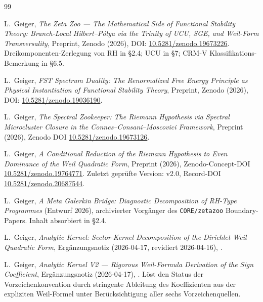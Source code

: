 \documentclass[a4paper,10pt,twocolumn]{article}
\theoremstyle{definition}
\theoremstyle{remark}
\begin{document}
\begin{thebibliography}{99}


L.~Geiger,
\textit{The Zeta Zoo --- The Mathematical Side of Functional
Stability Theory: Branch-Local Hilbert--P\'olya via the Trinity of
UCU, SGE, and Weil-Form Transversality},
Preprint, Zenodo (2026), DOI:
\href{https://doi.org/10.5281/zenodo.19673226}{10.5281/zenodo.19673226}.
Dreikomponenten-Zerlegung von $\mathrm{RH}$ in \S2.4; UCU in \S7;
CRM-V Klassifikations-Bemerkung in \S6.5.

L.~Geiger,
\textit{FST Spectrum Duality: The Renormalized Free Energy Principle
as Physical Instantiation of Functional Stability Theory},
Preprint, Zenodo (2026), DOI:
\href{https://doi.org/10.5281/zenodo.19036190}{10.5281/zenodo.19036190}.

L.~Geiger,
\textit{The Spectral Zookeeper: The Riemann Hypothesis via Spectral
Microcluster Closure in the Connes--Consani--Moscovici Framework},
Preprint (2026), Zenodo DOI
\href{https://doi.org/10.5281/zenodo.19673126}{10.5281/zenodo.19673126}.


L.~Geiger,
\textit{A Conditional Reduction of the Riemann Hypothesis to Even
Dominance of the Weil Quadratic Form},
Preprint (2026), Zenodo-Concept-DOI
\href{https://doi.org/10.5281/zenodo.19764771}{10.5281/zenodo.19764771}.
Zuletzt geprüfte Version: v2.0, Record-DOI
\href{https://doi.org/10.5281/zenodo.20687544}{10.5281/zenodo.20687544}.

L.~Geiger,
\textit{A Meta Galerkin Bridge: Diagnostic Decomposition of RH-Type
Programmes}
(Entwurf 2026), archivierter Vorgänger des \texttt{CORE/zetazoo}
Boundary-Papers. Inhalt absorbiert in \cite{MathMaster} \S2.4.

L.~Geiger,
\textit{Analytic Kernel: Sector-Kernel Decomposition of the
Dirichlet Weil Quadratic Form},
Ergänzungsnotiz (2026-04-17, revidiert 2026-04-16),
.

L.~Geiger,
\textit{Analytic Kernel V2 --- Rigorous Weil-Formula Derivation
of the Sign Coefficient},
Ergänzungsnotiz (2026-04-17),
.
Löst den Status der Vorzeichenkonvention durch stringente Ableitung des
Koeffizienten aus der expliziten Weil-Formel unter Berücksichtigung aller sechs Vorzeichenquellen.


\end{thebibliography}
\end{document}
